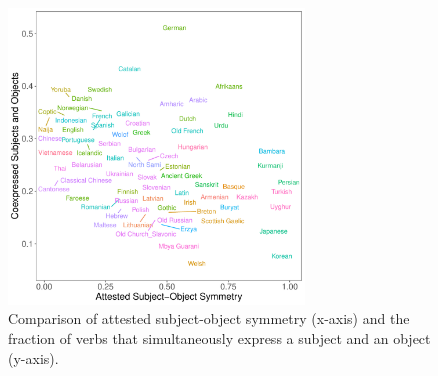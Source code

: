 \documentclass[11pt,a4paper]{article}
\begin{document}
\begin{figure}
    \centering
    \includegraphics[width=0.7\textwidth]{../analysis/figures/objects-order-pureud-byVerb_FORMAT.pdf}
    \caption{Comparison of attested subject-object symmetry (x-axis) and the fraction of verbs that simultaneously express a subject and an object (y-axis).}
    \label{fig:study2}
\end{figure}
\end{document}
